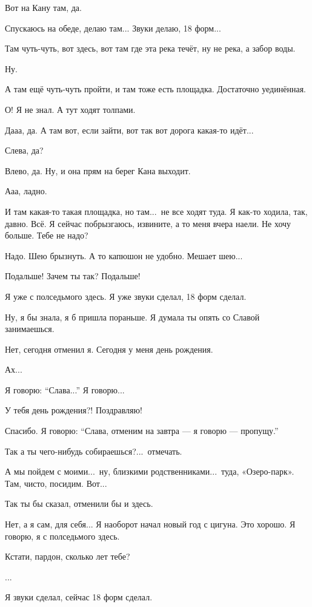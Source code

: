 \M
Вот на Кану там, да.

\I
Спускаюсь на обеде, делаю там...
Звуки делаю, 18 форм...

\M
Там чуть-чуть, вот здесь, вот там где эта река течёт, ну не река, а забор воды.

\I
Ну.

\M
А там ещё чуть-чуть пройти, и там тоже есть площадка.
Достаточно уединённая.

\I
О\null! Я не знал.
А тут ходят толпами.

\M
Дааа, да.
А там вот, если зайти, вот так вот
дорога какая-то идёт...

\I
Слева, да?

\M
Влево, да.
Ну, и она прям на берег Кана выходит.

\I
Ааа, ладно.

\M
И там какая-то такая площадка, но там...\ не все ходят туда.
Я как-то ходила, так, давно.
Всё. Я сейчас побрызгаюсь, извините, а то меня вчера наели.
Не хочу больше. Тебе не надо?

\I
Надо. Шею брызнуть. А то капюшон не удобно.
Мешает шею...

\M
Подальше! Зачем ты так? Подальше!

\I
Я уже с полседьмого здесь. Я уже
звуки сделал, 18 форм сделал.

\M
Ну, я бы знала, я б пришла пораньше.
Я думала ты опять со Славой занимаешься.

\I
Нет, сегодня отменил я. Сегодня у меня день рождения.

\M
Ах...

\I
Я говорю: ``Слава...'' Я говорю...

\M
У тебя день рождения?! Поздравляю!

\I
Спасибо.
Я говорю: ``Слава, отменим на завтра --- я говорю --- пропущу.''

\M
Так а ты чего-нибудь собираешься?...\ отмечать.

\I
А мы пойдем с моими...\ ну, близкими родственниками...\ туда, «Озеро-парк».
Там, чисто, посидим. Вот...

\M
Так ты бы сказал, отменили бы и здесь.

\I
Нет, а я сам, для себя...
Я наоборот начал новый год с цигуна. Это хорошо.
Я говорю, я с полседьмого здесь.

\M
Кстати, пардон, сколько лет тебе?


...

\I
Я звуки сделал, сейчас 18 форм сделал.


